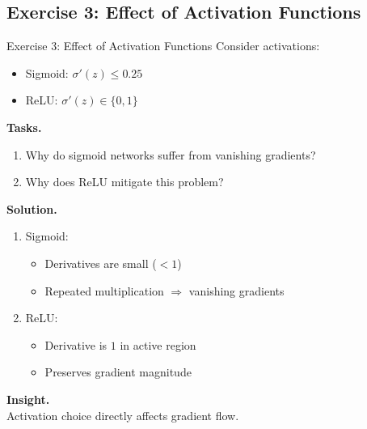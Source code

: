 \documentclass[aspectratio=169,11pt]{beamer}
\begin{document}
\subsection{Exercise 3: Effect of Activation Functions}
\begin{frame}[t,allowframebreaks]{Exercise 3: Effect of Activation Functions}
\small
Consider activations:

\begin{itemize}
    \item Sigmoid: $\sigma'(z) \leq 0.25$
    \item ReLU: $\sigma'(z) \in \{0,1\}$
\end{itemize}

\textbf{Tasks.}\\ \begin{enumerate}
    \item Why do sigmoid networks suffer from vanishing gradients?
    \item Why does ReLU mitigate this problem?
\end{enumerate}

\textbf{Solution.}\\ \begin{enumerate}
\item Sigmoid:
\begin{itemize}
    \item Derivatives are small ($<1$)
    \item Repeated multiplication $\Rightarrow$ vanishing gradients
\end{itemize}

\item ReLU:
\begin{itemize}
    \item Derivative is $1$ in active region
    \item Preserves gradient magnitude
\end{itemize}
\end{enumerate}

\textbf{Insight.}\\ Activation choice directly affects gradient flow.
\end{frame}
\end{document}
